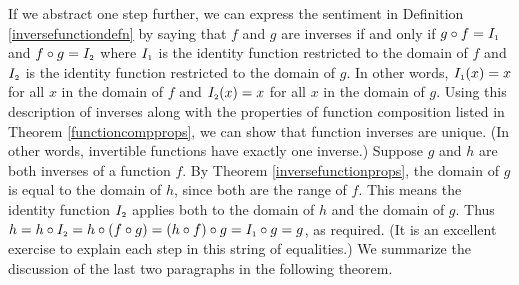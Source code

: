 If we abstract one step further, we can express the sentiment in Definition \ref{inversefunctiondefn} by saying that $f$ and $g$ are inverses if and only if  $g \circ f = I_{\mbox{\tiny $1$}}$ and $f \circ g = I_{\mbox{\tiny $2$}}$ where $I_{\mbox{\tiny $1$}}$ is the identity function restricted to the domain of $f$ and $I_{\mbox{\tiny $2$}}$ is the identity function restricted to the domain of $g$.  In other words, $I_{\mbox{\tiny $1$}}(x) = x$ for all $x$ in the domain of $f$ and $I_{\mbox{\tiny $2$}}(x) = x$ for all $x$ in the domain of $g$.   Using this description of inverses along with the properties of function composition listed in Theorem  \ref{functioncompprops}, we can show that function inverses are unique. (In other words, invertible functions have exactly one inverse.)  Suppose $g$ and $h$ are both inverses of a function $f$. By Theorem \ref{inversefunctionprops}, the domain of $g$ is equal to the domain of $h$, since both are the range of $f$.  This means the identity function $I_{\mbox{\tiny $2$}}$ applies both to the domain of $h$ and the domain of $g$.  Thus $h = h \circ I_{\mbox{\tiny $2$}} = h \circ (f \circ g) = (h \circ f) \circ g = I_{\mbox{\tiny $1$}} \circ g = g$, as required. (It is an excellent exercise to explain each step in this string of equalities.)  We summarize the discussion of the last two paragraphs in the following theorem.



 \label{inversefunctionuniqueness}

\smallskip


